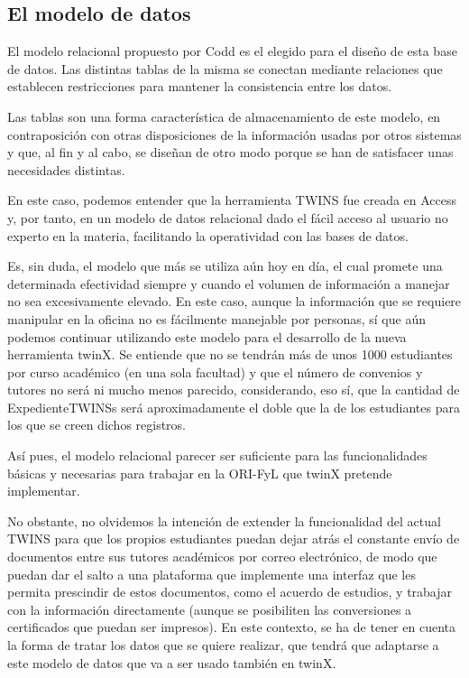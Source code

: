 \subsection{El modelo de datos}
\label{ModeloDatos}

El modelo relacional propuesto por Codd es el elegido para el diseño de esta base de datos. Las distintas tablas de la misma se conectan mediante relaciones que establecen restricciones para mantener la consistencia entre los datos.

Las tablas son una forma característica de almacenamiento de este modelo, en contraposición con otras disposiciones de la información usadas por otros sistemas y que, al fin y al cabo, se diseñan de otro modo porque se han de satisfacer unas necesidades distintas.

En este caso, podemos entender que la herramienta TWINS fue creada en Access y, por tanto, en un modelo de datos relacional dado el fácil acceso al usuario no experto en la materia, facilitando la operatividad con las bases de datos.

Es, sin duda, el modelo que más se utiliza aún hoy en día, el cual promete una determinada efectividad siempre y cuando el volumen de información a manejar no sea excesivamente elevado. En este caso, aunque la información que se requiere manipular en la oficina no es fácilmente manejable por personas, sí que aún podemos continuar utilizando este modelo para el desarrollo de la nueva herramienta twinX. Se entiende que no se tendrán más de unos 1000 estudiantes por curso académico (en una sola facultad) y que el número de convenios y tutores no será ni mucho menos parecido, considerando, eso sí, que la cantidad de \glspl{ExpedienteTWINS} será aproximadamente el doble que la de los estudiantes para los que se creen dichos registros.

Así pues, el modelo relacional parecer ser suficiente para las funcionalidades básicas y necesarias para trabajar en la ORI-FyL que twinX pretende implementar.

No obstante, no olvidemos la intención de extender la funcionalidad del actual TWINS para que los propios estudiantes puedan dejar atrás el constante envío de documentos entre sus tutores académicos por correo electrónico, de modo que puedan dar el salto a una plataforma que implemente una interfaz que les permita prescindir de estos documentos, como el acuerdo de estudios, y trabajar con la información directamente (aunque se posibiliten las conversiones a certificados que puedan ser impresos). En este contexto, se ha de tener en cuenta la forma de tratar los datos que se quiere realizar, que tendrá que adaptarse a este modelo de datos que va a ser usado también en twinX.


